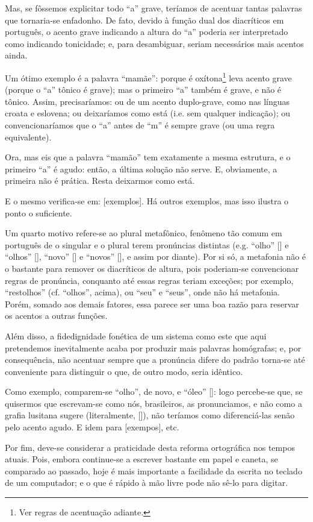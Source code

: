\documentclass[12pt, a5paper, titlepage]{article}
\begin{document}
Mas, se fôssemos explicitar todo ``a'' grave, teríamos de acentuar tantas palavras que tornaria-se enfadonho. De fato, devido à função dual dos diacríticos em português, o acento grave indicando a altura do ``a'' poderia ser interpretado como indicando tonicidade; e, para desambiguar, seriam necessários mais acentos ainda.

Um ótimo exemplo é a palavra ``mamãe'': porque é oxítona\footnote{Ver regras de acentuação adiante.} leva acento grave (porque o ``a'' tônico é grave); mas o primeiro ``a'' também é grave, e não é tônico. Assim, precisaríamos: ou de um acento duplo-grave, como nas línguas croata e eslovena; ou deixaríamos como está (i.e. sem qualquer indicação); ou convencionaríamos que o ``a'' antes de ``m'' é sempre grave (ou uma regra equivalente).

Ora, mas eis que a palavra ``mamão'' tem exatamente a mesma estrutura, e o primeiro ``a'' é agudo: então, a última solução não serve. E, obviamente, a primeira não é prática. Resta deixarmos como está.

E o mesmo verifica-se em: [exemplos]. Há outros exemplos, mas isso ilustra o ponto o suficiente.

Um quarto motivo refere-se ao plural metafônico, fenômeno tão comum em português de o singular e o plural terem pronúncias distintas (e.g. ``olho'' [] e ``olhos'' [], ``novo'' [] e ``novos'' [], e assim por diante). Por si só, a metafonia não é o bastante para remover os diacríticos de altura, pois poderiam-se convencionar regras de pronúncia, conquanto até essas regras teriam exceções; por exemplo, ``restolhos'' (cf. ``olhos'', acima), ou ``seu'' e ``seus'', onde não há metafonia. Porém, somado aos demais fatores, essa parece ser uma boa razão para reservar os acentos a outras funções.

Além disso, a fidedignidade fonética de um sistema como este que aqui pretendemos inevitalmente acaba por produzir mais palavras homógrafas; e, por consequência, não acentuar sempre que a pronúncia difere do padrão torna-se até conveniente para distinguir o que, de outro modo, seria idêntico.

Como exemplo, comparem-se ``olho'', de novo, e ``óleo'' []: logo percebe-se que, se quisermos que escrevam-se como nós, brasileiros, as pronunciamos, e não como a grafia lusitana sugere (literalmente, []), não teríamos como diferenciá-las senão pelo acento agudo. E idem para [exempos], etc.

Por fim, deve-se considerar a praticidade desta reforma ortográfica nos tempos atuais. Pois, embora continue-se a escrever bastante em papel e caneta, se comparado ao passado, hoje é mais importante a facilidade da escrita no teclado de um computador; e o que é rápido à mão livre pode não sê-lo para digitar.
\end{document}
